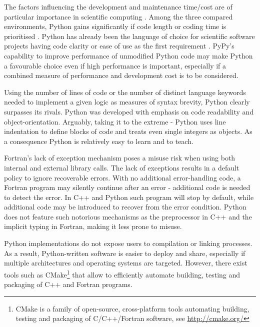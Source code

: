 \documentclass[twocolumn]{article}
\newcommand{\changed}[1]{#1}
\begin{document}
  \changed{
  The factors influencing the development and maintenance time/cost \changed{are}
    of particular importance in scientific computing \citep{Wilson_2006}.
  Among the three compared environments, 
    Python gains significantly if code length or coding time
    is prioritised \citep[see also discussion in][]{Lin_2012}.
  Python has already been the language of choice for scientific software projects having code clarity 
    or ease of use as the first requirement \citep[see e.g.][]{Barnes_and_Jones_2011}.
  PyPy's capability to improve performance of unmodified Python code may 
    make Python a favourable choice even if high performance is important, especially
    if a combined measure of performance and development cost is to be considered. 

  Using the number of lines of code or the number of distinct language keywords
    needed to implement a given logic as measures of syntax 
    brevity, Python clearly surpasses its rivals.
  Python was developed with emphasis on code readability and object-orientation.
  Arguably, taking it to the extreme - Python uses line indentation to define 
    blocks of code and treats even single integers as objects.
  As a consequence Python is \changed{relatively} easy to learn and to teach.

  Fortran's lack of exception mechanism poses a misuse risk when using 
    both internal and external library calls.
  The lack of exceptions results in a default policy to ignore 
    recoverable errors. 
  With no additional error-handling code, a Fortran program may silently continue after an  
    error - additional code is needed to detect the error. 
  In C++ and Python such program will stop by default, while additional code may be introduced to recover from the error condition.
  Python does not feature such notorious mechanisms as
    the preprocessor in C++ and the implicit typing in Fortran,
    making it less prone to misuse.

  Python implementations do not expose users to compilation or linking processes. 
  As a result, Python-written software is easier to deploy and share, especially 
    if multiple architectures and operating systems are targeted.
  However, there exist tools such as CMake\footnote{CMake is a family of open-source, cross-platform
    tools automating building, testing and packaging of C/C++/Fortran software,
    see \url{http://cmake.org/}}
    that allow to efficiently automate 
    building, testing and packaging of C++ and Fortran programs.

}
\end{document}
